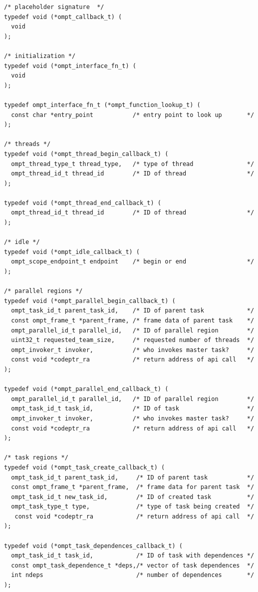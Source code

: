 \documentclass{article}
\begin{document}
\begin{verbatim}
/* placeholder signature  */	
typedef void (*ompt_callback_t) (    
  void
);

/* initialization */
typedef void (*ompt_interface_fn_t) (
  void
);

typedef ompt_interface_fn_t (*ompt_function_lookup_t) (
  const char *entry_point           /* entry point to look up       */
);

/* threads */	
typedef void (*ompt_thread_begin_callback_t) (
  ompt_thread_type_t thread_type,   /* type of thread               */	   
  ompt_thread_id_t thread_id        /* ID of thread                 */
);
					   
typedef void (*ompt_thread_end_callback_t) (
  ompt_thread_id_t thread_id        /* ID of thread                 */
);

/* idle */					    						    
typedef void (*ompt_idle_callback_t) ( 
  ompt_scope_endpoint_t endpoint    /* begin or end                 */
);

/* parallel regions */								    							   	    
typedef void (*ompt_parallel_begin_callback_t) (
  ompt_task_id_t parent_task_id,    /* ID of parent task            */
  const ompt_frame_t *parent_frame, /* frame data of parent task    */
  ompt_parallel_id_t parallel_id,   /* ID of parallel region        */
  uint32_t requested_team_size,     /* requested number of threads  */
  ompt_invoker_t invoker,           /* who invokes master task?     */
  const void *codeptr_ra            /* return address of api call   */ 
);

typedef void (*ompt_parallel_end_callback_t) (
  ompt_parallel_id_t parallel_id,   /* ID of parallel region        */
  ompt_task_id_t task_id,           /* ID of task                   */
  ompt_invoker_t invoker,           /* who invokes master task?     */
  const void *codeptr_ra            /* return address of api call   */ 
);

/* task regions */
typedef void (*ompt_task_create_callback_t) ( 
  ompt_task_id_t parent_task_id,     /* ID of parent task           */
  const ompt_frame_t *parent_frame,  /* frame data for parent task  */
  ompt_task_id_t new_task_id,        /* ID of created task          */
  ompt_task_type_t type,             /* type of task being created  */ 
   const void *codeptr_ra            /* return address of api call  */ 
);

typedef void (*ompt_task_dependences_callback_t) (                                   
  ompt_task_id_t task_id,            /* ID of task with dependences */
  const ompt_task_dependence_t *deps,/* vector of task dependences  */
  int ndeps                          /* number of dependences       */
);


\end{verbatim}
\end{document}
